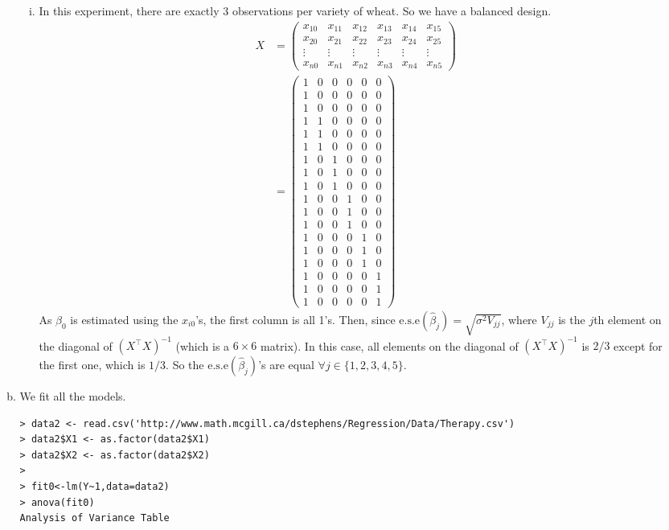 \documentclass[10pt]{article}
\begin{document}
\begin{enumerate}
\begin{enumerate}[(a)]
\begin{enumerate}[(i)]
			\item In this experiment, there are exactly 3 observations per variety of wheat. So we have a balanced design. 
			\begin{align*}
				X &= \left( \begin{array}{cccccc}
x_{10} & x_{11} & x_{12} & x_{13} & x_{14} & x_{15}\\
x_{20} & x_{21} & x_{22} & x_{23} & x_{24} & x_{25}\\
\vdots &\vdots &\vdots & \vdots &\vdots &\vdots \\
x_{n0} & x_{n1} & x_{n2} & x_{n3} & x_{n4} & x_{n5} \end{array} \right)\\
		&=\left( \begin{array}{cccccc}
1&0&0&0&0&0\\
1&0&0&0&0&0\\
1&0&0&0&0&0\\
1&1&0&0&0&0\\
1&1&0&0&0&0\\
1&1&0&0&0&0\\
1&0&1&0&0&0\\
1&0&1&0&0&0\\
1&0&1&0&0&0\\
1&0&0&1&0&0\\
1&0&0&1&0&0\\
1&0&0&1&0&0\\
1&0&0&0&1&0\\
1&0&0&0&1&0\\
1&0&0&0&1&0\\
1&0&0&0&0&1\\
1&0&0&0&0&1\\
1&0&0&0&0&1 \end{array} \right)
			\end{align*}
			As $\beta_0$ is estimated using the $x_{i0}$'s, the first column is all 1's. Then, since $\mbox{e.s.e}(\hat{\beta}_j) = \sqrt{\sigma^2 V_{jj}}$, where $V_{jj}$ is the $j$th element on the diagonal of $(X^\top X)^{-1}$ (which is a $6\times 6$ matrix). In this case, all elements on the diagonal of $(X^\top X)^{-1}$ is $2/3$ except for the first one, which is $1/3$. So the $\mbox{e.s.e}(\hat{\beta}_j)$'s are equal $\forall j \in \{1,2,3,4,5\}$. 
		\end{enumerate}
		\item We fit all the models.
			\begin{lstlisting}
> data2 <- read.csv('http://www.math.mcgill.ca/dstephens/Regression/Data/Therapy.csv')
> data2$X1 <- as.factor(data2$X1)
> data2$X2 <- as.factor(data2$X2)
> 
> fit0<-lm(Y~1,data=data2)
> anova(fit0)
Analysis of Variance Table


\end{lstlisting}
\end{enumerate}
\end{enumerate}
\end{document}
